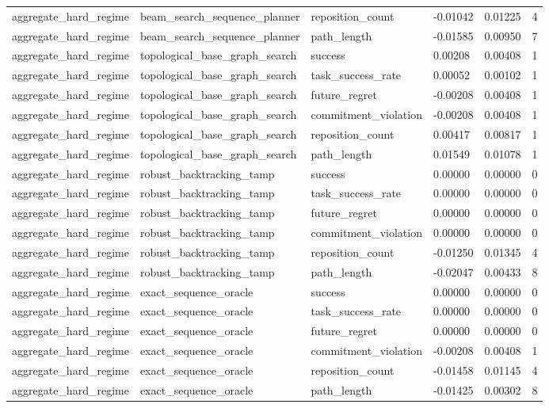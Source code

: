 \documentclass{article}
\begin{document}
\begin{table}[tbp]
{\begin{tabular}{llllll}
aggregate\_hard\_regime & beam\_search\_sequence\_planner & reposition\_count & -0.01042 & 0.01225 & 4 \\
aggregate\_hard\_regime & beam\_search\_sequence\_planner & path\_length & -0.01585 & 0.00950 & 7 \\
aggregate\_hard\_regime & topological\_base\_graph\_search & success & 0.00208 & 0.00408 & 1 \\
aggregate\_hard\_regime & topological\_base\_graph\_search & task\_success\_rate & 0.00052 & 0.00102 & 1 \\
aggregate\_hard\_regime & topological\_base\_graph\_search & future\_regret & -0.00208 & 0.00408 & 1 \\
aggregate\_hard\_regime & topological\_base\_graph\_search & commitment\_violation & -0.00208 & 0.00408 & 1 \\
aggregate\_hard\_regime & topological\_base\_graph\_search & reposition\_count & 0.00417 & 0.00817 & 1 \\
aggregate\_hard\_regime & topological\_base\_graph\_search & path\_length & 0.01549 & 0.01078 & 1 \\
aggregate\_hard\_regime & robust\_backtracking\_tamp & success & 0.00000 & 0.00000 & 0 \\
aggregate\_hard\_regime & robust\_backtracking\_tamp & task\_success\_rate & 0.00000 & 0.00000 & 0 \\
aggregate\_hard\_regime & robust\_backtracking\_tamp & future\_regret & 0.00000 & 0.00000 & 0 \\
aggregate\_hard\_regime & robust\_backtracking\_tamp & commitment\_violation & 0.00000 & 0.00000 & 0 \\
aggregate\_hard\_regime & robust\_backtracking\_tamp & reposition\_count & -0.01250 & 0.01345 & 4 \\
aggregate\_hard\_regime & robust\_backtracking\_tamp & path\_length & -0.02047 & 0.00433 & 8 \\
aggregate\_hard\_regime & exact\_sequence\_oracle & success & 0.00000 & 0.00000 & 0 \\
aggregate\_hard\_regime & exact\_sequence\_oracle & task\_success\_rate & 0.00000 & 0.00000 & 0 \\
aggregate\_hard\_regime & exact\_sequence\_oracle & future\_regret & 0.00000 & 0.00000 & 0 \\
aggregate\_hard\_regime & exact\_sequence\_oracle & commitment\_violation & -0.00208 & 0.00408 & 1 \\
aggregate\_hard\_regime & exact\_sequence\_oracle & reposition\_count & -0.01458 & 0.01145 & 4 \\
aggregate\_hard\_regime & exact\_sequence\_oracle & path\_length & -0.01425 & 0.00302 & 8 \\
\bottomrule
\end{tabular}
}
\end{table}
\end{document}
